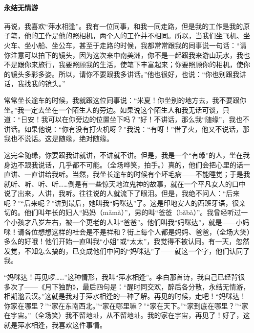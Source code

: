 \paragraph*{永结无情游}
\par 再说，我喜欢“萍水相逢”。我有一位同事，和我一同走路，但是我的工作是我的原子笔，他的工作是他的照相机，两个人的工作并不相同。所以，当我们坐飞机、坐火车、坐小船、坐公车，甚至于走路的时候，我都常常跟我的同事说一句话：“请你注意可以拍下的镜头，因为这次来中南美洲，你不是一起跟我来游山玩水，我也不是跟你来旅行，我要照顾我的生活，使笔下丰富起来；你要照顾你的相机，使你的镜头多彩多姿。所以，请你不要跟我多讲话。”他也很好，也说：“你也别跟我讲话，我找我的镜头。”
\par 常常坐长途车的时候，我就跟这位同事说：“米夏！你坐别的地方去，我不要跟你坐。”我一定去坐在一个陌生人的旁边。如果说这个陌生人和我无话可谈，只道：“日安！我可以在你旁边的位置坐下吗？”好！不讲话，那么我“随缘”，我也不讲话。如果他说：“你有没有打火机呀？”我说：“有呀！”借了火，他又不说话，那我也不说话。这是随缘，绝对随缘。
\par 这完全随缘，你要跟我讲就讲，不讲就不讲。但是，我是一个“有缘”的人，坐在我身边不跟我说话，几乎都不可能。（全场哗笑，拍手。）真的，他们会把心里的话一直讲、一直讲给我听。当然，我坐长途车的时候有个坏毛病——不能睡觉；于是我就听、听、听、听……倒是有一些惊天地泣鬼神的故事，就在一个平凡女人的口中说了出来，人讲，我听。往往说的人就流下了眼泪。但是，我绝不问人：“后来呢？”“后来呢？”讲到最后，她叫我“妈咪达”了。这是印地安人的西班牙语，很亲切的。他们叫年长的妇人“妈妈（mǎmà）”，男的叫“爸爸（bǎbà）”。我曾经听过一个小孩才八岁左右，被一个更老的人叫“爸爸”。他们叫我“妈咪达”，就是——小妈咪！请各位想想这样的社会是不是祥和？街上每个人都是妈妈、爸爸，（全场大笑）多么的好哦！他们开始一直叫我“小姐”或“太太”，我觉得不被认同。有一天，忽然发觉，不知怎么搞的，已变成他们中间的“妈咪达”了——就这一个字，他们认同了我。
\par “妈咪达！再见啰……”这种情形，我叫“萍水相逢”。李白那首诗，我自己已经背很多次了——《月下独酌》，最后四句是：“醒时同交欢，醉后各分散，永结无情游，相期邈云汉。”这就是我对于萍水相逢的一种了解。再见的时候，走吧！“妈咪达！你家在哪里？”“家在东南西北。”“家在哪里嘛？”“家在天下。”“家到底在哪里？”“家在宇宙。”（全场笑）我不留地址，从不留地址。我的家在宇宙，再见了！好了，这就是萍水相逢，我喜欢这件事情。
